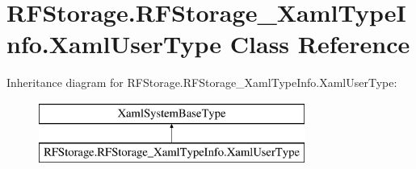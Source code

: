 \hypertarget{class_r_f_storage_1_1_r_f_storage___xaml_type_info_1_1_xaml_user_type}{}\section{R\+F\+Storage.\+R\+F\+Storage\+\_\+\+Xaml\+Type\+Info.\+Xaml\+User\+Type Class Reference}
\label{class_r_f_storage_1_1_r_f_storage___xaml_type_info_1_1_xaml_user_type}
Inheritance diagram for R\+F\+Storage.\+R\+F\+Storage\+\_\+\+Xaml\+Type\+Info.\+Xaml\+User\+Type\+:\begin{figure}[H]
\begin{center}
\leavevmode
\includegraphics[height=2.000000cm]{class_r_f_storage_1_1_r_f_storage___xaml_type_info_1_1_xaml_user_type}
\end{center}
\end{figure}
